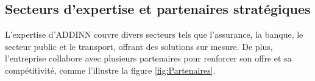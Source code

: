 \subsection{Secteurs d'expertise et partenaires stratégiques} 
    L'expertise d'ADDINN couvre divers secteurs tels que l'assurance, la banque, le secteur public et le transport, offrant des solutions sur mesure. De plus, l'entreprise collabore avec plusieurs partenaires pour renforcer son offre et sa compétitivité, comme l'illustre la figure \ref{fig:Partenaires}.
    \vspace{-0.3cm}
    \begin{figure}[H]
        \centering
        \renewcommand{\thesubfigure}{}
         \\
        

\end{figure}

